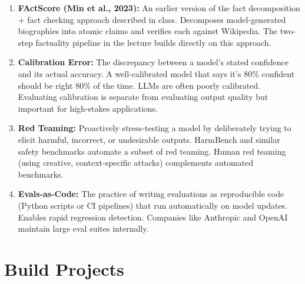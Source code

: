 \documentclass[11pt, a4paper]{article}
\begin{document}
\begin{enumerate}[leftmargin=2em]
  \item \textbf{FActScore (Min et al., 2023):} An earlier version of the fact decomposition + fact checking approach described in class. Decomposes model-generated biographies into atomic claims and verifies each against Wikipedia. The two-step factuality pipeline in the lecture builds directly on this approach.

  \item \textbf{Calibration Error:} The discrepancy between a model's stated confidence and its actual accuracy. A well-calibrated model that says it's 80\% confident should be right 80\% of the time. LLMs are often poorly calibrated. Evaluating calibration is separate from evaluating output quality but important for high-stakes applications.

  \item \textbf{Red Teaming:} Proactively stress-testing a model by deliberately trying to elicit harmful, incorrect, or undesirable outputs. HarmBench and similar safety benchmarks automate a subset of red teaming. Human red teaming (using creative, context-specific attacks) complements automated benchmarks.

  \item \textbf{Evals-as-Code:} The practice of writing evaluations as reproducible code (Python scripts or CI pipelines) that run automatically on model updates. Enables rapid regression detection. Companies like Anthropic and OpenAI maintain large eval suites internally.
\end{enumerate}

\newpage
\section{Build Projects}
\end{document}
